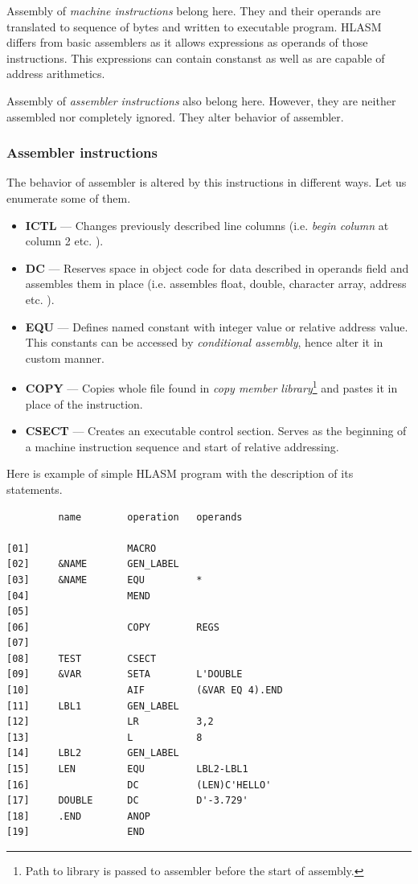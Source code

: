 Assembly of \textit{machine instructions} belong here. They and their operands are translated to sequence of bytes and written to executable program. HL\-ASM differs from basic assemblers as it allows expressions as operands of those instructions. This expressions can contain constanst as well as are capable of address arithmetics.

Assembly of \textit{assembler instructions} also belong here. However, they are neither assembled nor completely ignored. They alter behavior of assembler.

\subsubsection{Assembler instructions}
The behavior of assembler is altered by this instructions in different ways. Let us enumerate some of them.
 
\begin{itemize}
	\item \textbf{ICTL} --- Changes previously described line columns (i.e. \textit{begin column} at column 2 etc. ).
	
	\item \textbf{DC} --- Reserves space in object code for data described in operands field and assembles them in place (i.e. assembles float, double, character array, address etc. ).
	
	\item \textbf{EQU} --- Defines named constant with integer value or relative address value. This constants can be accessed by \textit{conditional assembly}, hence alter it in custom manner.
	
	\item \textbf{COPY} --- Copies whole file found in \textit{copy member library}\footnote{Path to library is passed to assembler before the start of assembly.} and pastes it in place of the instruction.
	
	\item \textbf{CSECT} --- Creates an executable control section. Serves as the beginning of a machine instruction sequence and start of relative addressing.
\end{itemize}

Here is example of simple HLASM program with the description of its statements.

\begin{verbatim}
         name        operation   operands
         
[01]                 MACRO                   
[02]     &NAME       GEN_LABEL
[03]     &NAME       EQU         *
[04]                 MEND
[05]             
[06]                 COPY        REGS
[07]             
[08]     TEST        CSECT
[09]     &VAR        SETA        L'DOUBLE
[10]                 AIF         (&VAR EQ 4).END
[11]     LBL1        GEN_LABEL
[12]                 LR          3,2
[13]                 L           8
[14]     LBL2        GEN_LABEL
[15]     LEN         EQU         LBL2-LBL1
[16]                 DC          (LEN)C'HELLO'
[17]     DOUBLE      DC          D'-3.729'
[18]     .END        ANOP
[19]                 END
\end{verbatim} 

